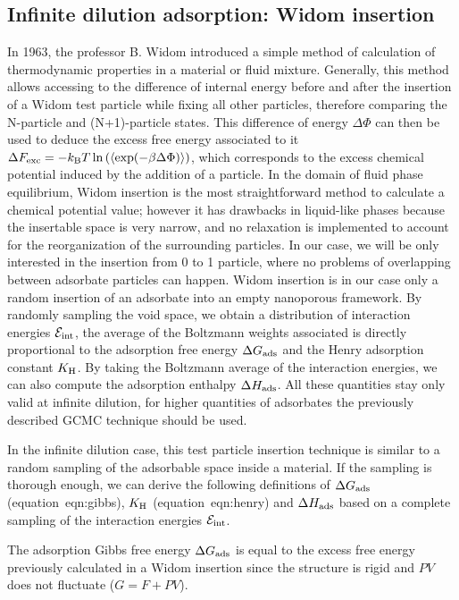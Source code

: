 \documentclass[main.tex]{subfiles}
\begin{document}
\subsection{Infinite dilution adsorption: Widom insertion}

In 1963, the professor B. Widom introduced a simple method of calculation of thermodynamic properties in a material or fluid mixture.\cite{Widom1963} Generally, this method allows accessing to the difference of internal energy before and after the insertion of a Widom test particle while fixing all other particles, therefore comparing the N-particle and (N+1)-particle states. This difference of energy $\Delta \Phi$ can then be used to deduce the excess free energy associated to it $\Delta F_{\text{exc}} = -k_{\text{B}} T \ln\left(\langle \exp(- \beta\Delta \Phi) \rangle\right)$, which corresponds to the excess chemical potential induced by the addition of a particle. In the domain of fluid phase equilibrium, Widom insertion is the most straightforward method to calculate a chemical potential value; however it has drawbacks in liquid-like phases because the insertable space is very narrow, and no relaxation is implemented to account for the reorganization of the surrounding particles.\cite{Nezbeda_1991} In our case, we will be only interested in the insertion from 0 to 1 particle, where no problems of overlapping between adsorbate particles can happen. Widom insertion is in our case only a random insertion of an adsorbate into an empty nanoporous framework. By randomly sampling the void space, we obtain a distribution of interaction energies $\mathcal{E}_{\text{int}}$, the average of the Boltzmann weights associated is directly proportional to the adsorption free energy $\Delta G_{\text{ads}}$ and the Henry adsorption constant $K_{\text{H}}$. By taking the Boltzmann average of the interaction energies, we can also compute the adsorption enthalpy $\Delta H_{\text{ads}}$. All these quantities stay only valid at infinite dilution, for higher quantities of adsorbates the previously described GCMC technique should be used.  

In the infinite dilution case, this test particle insertion technique is similar to a random sampling of the adsorbable space inside a material. If the sampling is thorough enough, we can derive the following definitions of $\Delta G_{\text{ads}}$ (equation~{eqn:gibbs}), $K_{\text{H}}$ (equation~{eqn:henry}) and $\Delta H_{\text{ads}}$ based on a complete sampling of the interaction energies $\mathcal{E}_{\text{int}}$. 

The adsorption Gibbs free energy $\Delta G_{\text{ads}}$ is equal to the excess free energy previously calculated in a Widom insertion since the structure is rigid and $PV$ does not fluctuate ($G = F + PV$). 
\end{document}
